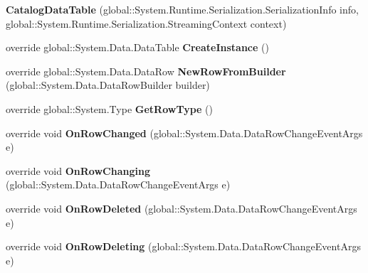 \begin{DoxyCompactItemize}
\item 
{\bfseries Catalog\+Data\+Table} (global\+::\+System.\+Runtime.\+Serialization.\+Serialization\+Info info, global\+::\+System.\+Runtime.\+Serialization.\+Streaming\+Context context)\hypertarget{class_products_1_1_data_1_1ds_sage_1_1_catalog_data_table_a53e9623d178c7a37deb4b9a14c028b61}{}\label{class_products_1_1_data_1_1ds_sage_1_1_catalog_data_table_a53e9623d178c7a37deb4b9a14c028b61}

\item 
override global\+::\+System.\+Data.\+Data\+Table {\bfseries Create\+Instance} ()\hypertarget{class_products_1_1_data_1_1ds_sage_1_1_catalog_data_table_a282da7b84076afed3c47b9c9f51ab6cb}{}\label{class_products_1_1_data_1_1ds_sage_1_1_catalog_data_table_a282da7b84076afed3c47b9c9f51ab6cb}

\item 
override global\+::\+System.\+Data.\+Data\+Row {\bfseries New\+Row\+From\+Builder} (global\+::\+System.\+Data.\+Data\+Row\+Builder builder)\hypertarget{class_products_1_1_data_1_1ds_sage_1_1_catalog_data_table_a800e3321ba862918315c4ab80c8d6ce5}{}\label{class_products_1_1_data_1_1ds_sage_1_1_catalog_data_table_a800e3321ba862918315c4ab80c8d6ce5}

\item 
override global\+::\+System.\+Type {\bfseries Get\+Row\+Type} ()\hypertarget{class_products_1_1_data_1_1ds_sage_1_1_catalog_data_table_afc5792bdc5b44e3496da4e751ee32624}{}\label{class_products_1_1_data_1_1ds_sage_1_1_catalog_data_table_afc5792bdc5b44e3496da4e751ee32624}

\item 
override void {\bfseries On\+Row\+Changed} (global\+::\+System.\+Data.\+Data\+Row\+Change\+Event\+Args e)\hypertarget{class_products_1_1_data_1_1ds_sage_1_1_catalog_data_table_aa35ab92c467402deeadf5c1b7bc8480a}{}\label{class_products_1_1_data_1_1ds_sage_1_1_catalog_data_table_aa35ab92c467402deeadf5c1b7bc8480a}

\item 
override void {\bfseries On\+Row\+Changing} (global\+::\+System.\+Data.\+Data\+Row\+Change\+Event\+Args e)\hypertarget{class_products_1_1_data_1_1ds_sage_1_1_catalog_data_table_a4d4a402ff9de35a324e8614f8f51da6d}{}\label{class_products_1_1_data_1_1ds_sage_1_1_catalog_data_table_a4d4a402ff9de35a324e8614f8f51da6d}

\item 
override void {\bfseries On\+Row\+Deleted} (global\+::\+System.\+Data.\+Data\+Row\+Change\+Event\+Args e)\hypertarget{class_products_1_1_data_1_1ds_sage_1_1_catalog_data_table_a592360d8bc8c97d75f2870e4d11b5eac}{}\label{class_products_1_1_data_1_1ds_sage_1_1_catalog_data_table_a592360d8bc8c97d75f2870e4d11b5eac}

\item 
override void {\bfseries On\+Row\+Deleting} (global\+::\+System.\+Data.\+Data\+Row\+Change\+Event\+Args e)\hypertarget{class_products_1_1_data_1_1ds_sage_1_1_catalog_data_table_af017f07cda9ce6cc0cbde6ba42ab3cfb}{}\label{class_products_1_1_data_1_1ds_sage_1_1_catalog_data_table_af017f07cda9ce6cc0cbde6ba42ab3cfb}

\end{DoxyCompactItemize}
